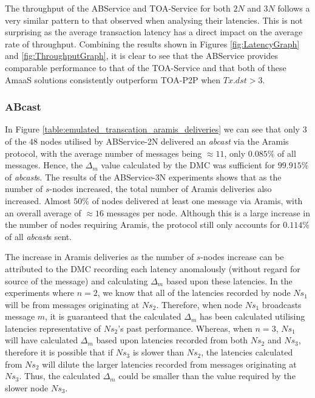	The throughput of the ABService and TOA-Service for both $2N$ and $3N$ follows a very similar pattern to that observed when analysing their latencies.  This is not surprising as the average transaction latency has a direct impact on the average rate of throughput.  Combining the results shown in Figures \ref{fig:LatencyGraph} and \ref{fig:ThroughputGraph}, it is clear to see that the ABService provides comparable performance to that of the TOA-Service and that both of these \textsf{AmaaS} solutions consistently outperform TOA-P2P when $Tx.dst > 3$.  
	
	\subsubsection*{ABcast}
	In Figure \ref{table:emulated_transcation_aramis_deliveries} we can see that only $3$ of the $48$ nodes utilised by ABService-2N delivered an \emph{abcast} via the \textsf{Aramis} protocol, with the average number of messages being $\approx 11$, only $0.085\%$ of all messages.  Hence, the $\Delta_m$ value calculated by the DMC was sufficient for  $99.915\%$ of \emph{abcast}s.  The results of the ABService-3N experiments shows that as the number of $s$-nodes increased,  the total number of \textsf{Aramis} deliveries also increased.  Almost $50\%$ of nodes delivered at least one message via \textsf{Aramis}, with an overall average of $\approx 16$ messages per node.  Although this is a large increase in the number of nodes requiring \textsf{Aramis}, the protocol still only accounts for $0.114\%$ of all \emph{abcast}s sent.  
	
	The increase in \textsf{Aramis} deliveries as the number of $s$-nodes increase can be attributed to the DMC recording each latency anomalously (without regard for source of the message) and calculating $\Delta_m$ based upon these latencies.  In the experiments where $n=2$, we know that all of the latencies recorded by node $Ns_1$ will be from messages originating at $Ns_2$.  Therefore, when node $Ns_1$ broadcasts message $m$, it is guaranteed that the calculated $\Delta_m$ has been calculated utilising latencies representative of $Ns_2$'s past performance.  Whereas, when $n=3$, $Ns_1$ will have calculated $\Delta_m$ based upon latencies recorded from both $Ns_2$ and $Ns_3$, therefore it is possible that if $Ns_3$ is slower than $Ns_2$, the latencies calculated from $Ns_2$ will dilute the larger latencies recorded from messages originating at $Ns_3$.  Thus, the calculated $\Delta_m$ could be smaller than the value required by the slower node $Ns_3$.  
	
